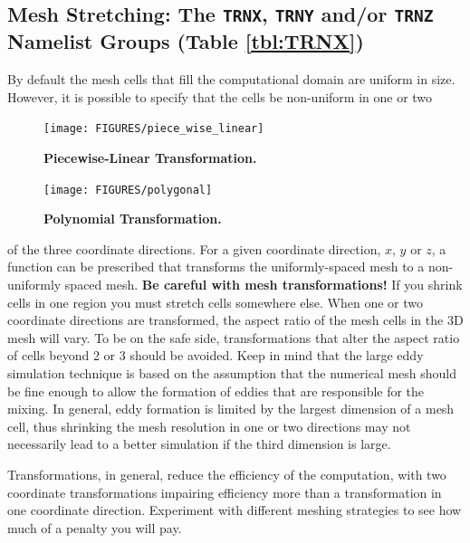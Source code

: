 \documentclass[11pt]{book}
\begin{document}
\subsection{Mesh Stretching: The \texorpdfstring{{\tt TRNX}}{TRNX}, \texorpdfstring{{\tt TRNY}}{TRNY} and/or \texorpdfstring{{\tt TRNZ}}{TRNZ} Namelist Groups (Table \ref{tbl:TRNX})}
\label{info:TRNX}

By default the mesh cells that fill the computational domain are uniform in size.
However, it is possible to specify that the cells be non-uniform in one or two
\begin{figure}[ht]
\begin{minipage}[t]{3.1in}
\texttt{[image: FIGURES/piece\_wise\_linear]}
\vspace{-.2in}
\caption{\bf Piecewise-Linear Transformation.}
\label{fig:grid2}
\end{minipage}
\hfill
\begin{minipage}[t]{3.1in}
\texttt{[image: FIGURES/polygonal]}
\vspace{-.2in}
\caption{\bf Polynomial Transformation.}
\label{fig:grid1}
\end{minipage}
\end{figure}
of the three coordinate directions.
For a given coordinate direction, $x$, $y$ or $z$, a function can be
prescribed that transforms the uniformly-spaced mesh to a
non-uniformly spaced mesh. {\bf Be careful with mesh transformations!}  If you shrink cells in one
region you must stretch cells somewhere else. When one
or two coordinate directions are transformed, the aspect ratio of the
mesh cells in the 3D mesh will vary. To be on the safe side, transformations
that alter the aspect ratio of cells beyond 2 or 3 should be avoided.
Keep in mind that the large eddy simulation technique is based on the
assumption that the numerical mesh should be fine enough to allow the formation
of eddies that are responsible for the mixing. In general, eddy formation
is limited by the largest dimension of a mesh cell, thus shrinking the
mesh resolution in one or two directions may not necessarily lead to a better
simulation if the third dimension is large.

\begin{warning}
\noindent
Transformations, in general, reduce the efficiency of the computation,
with two coordinate transformations impairing efficiency more
than a transformation in one coordinate direction. Experiment with different meshing
strategies to see how much of a penalty you will pay.
\end{warning}
\end{document}
